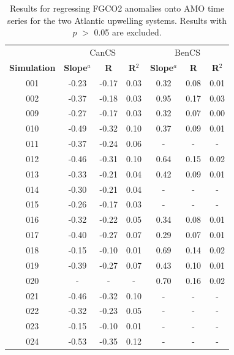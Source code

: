 \documentclass[12pt]{article}
\begin{document}
\newpage
\begin{table}[!h]
	\centering
	\caption{Results for regressing FGCO2 anomalies onto AMO time series for the two Atlantic upwelling systems. Results with $p$ $>$ 0.05 are excluded.}
	\begin{tabular}{c c c c | c c c}
		& \multicolumn{3}{c}{CanCS} & \multicolumn{3}{c}{BenCS} \\
		\cmidrule{2-4}\cmidrule{5-7}
		\textbf{Simulation} &  \textbf{Slope}$^{a}$  &  \textbf{R} &  \textbf{R$^{2}$} &  \textbf{Slope}$^{a}$  &  \textbf{R} &  \textbf{R$^{2}$}  \\
		\midrule
		001 &  -0.23 &    -0.17 &       0.03 &   0.32 &     0.08 &       0.01 \\
		002 &  -0.37 &    -0.18 &       0.03 &   0.95 &     0.17 &       0.03 \\
		009 &  -0.27 &    -0.17 &       0.03 &   0.32 &     0.07 &       0.00 \\
		010 &  -0.49 &    -0.32 &       0.10 &   0.37 &     0.09 &       0.01 \\
		011 &  -0.37 &    -0.24 &       0.06 &    - &      - &        - \\
		012 &  -0.46 &    -0.31 &       0.10 &   0.64 &     0.15 &       0.02 \\
		013 &  -0.33 &    -0.21 &       0.04 &   0.42 &     0.09 &       0.01 \\
		014 &  -0.30 &    -0.21 &       0.04 &    - &      - &        - \\
		015 &  -0.26 &    -0.17 &       0.03 &    - &      - &        - \\
		016 &  -0.32 &    -0.22 &       0.05 &   0.34 &     0.08 &       0.01 \\
		017 &  -0.40 &    -0.27 &       0.07 &   0.29 &     0.07 &       0.01 \\
		018 &  -0.15 &    -0.10 &       0.01 &   0.69 &     0.14 &       0.02 \\
		019 &  -0.39 &    -0.27 &       0.07 &   0.43 &     0.10 &       0.01 \\
		020 &    - &      - &        - &   0.70 &     0.16 &       0.02 \\
		021 &  -0.46 &    -0.32 &       0.10 &    - &      - &        - \\
		022 &  -0.32 &    -0.23 &       0.05 &    - &      - &        - \\
		023 &  -0.15 &    -0.10 &       0.01 &    - &      - &        - \\
		024 &  -0.53 &    -0.35 &       0.12 &    - &      - &        - \\

\end{tabular}
\end{table}
\end{document}
